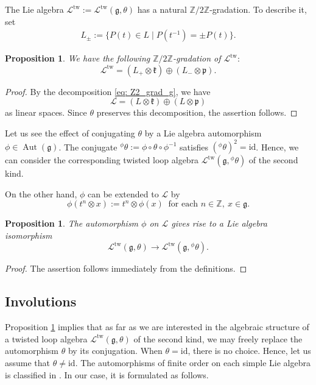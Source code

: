 \documentclass[12pt,a4paper]{amsart}
\newtheorem{prop}[thm]{Proposition}
\theoremstyle{definition}
\numberwithin{equation}{subsection}
\begin{document}
The Lie algebra $\mathcal{L}^\mathrm{tw} := \mathcal{L}^{\mathrm{tw}}(\mathfrak{g},\theta)$ has a natural $\mathbb{Z}/2\mathbb{Z}$-gradation.
To describe it, set
\begin{align}\label{eq: Lpm}
  L_\pm := \{ P(t) \in L \mid P(t^{-1}) = \pm P(t) \}.
\end{align}

\begin{prop}
  We have the following $\mathbb{Z}/2\mathbb{Z}$-gradation of $\mathcal{L}^\mathrm{tw}$$:$
  \[
    \mathcal{L}^\mathrm{tw} = (L_+ \otimes \mathfrak{k}) \oplus (L_- \otimes \mathfrak{p}).
  \]
\end{prop}

\begin{proof}
  By the decomposition \eqref{eq: Z2_grad_g}, we have
  \[
    \mathcal{L} = (L \otimes \mathfrak{k}) \oplus (L \otimes \mathfrak{p})
  \]
  as linear spaces.
  Since $\theta$ preserves this decomposition, the assertion follows.
\end{proof}


Let us see the effect of conjugating $\theta$ by a Lie algebra automorphism $\phi \in \operatorname{Aut}(\mathfrak{g})$.
The conjugate ${}^\phi \theta := \phi \circ \theta \circ \phi^{-1}$ satisfies $({}^\phi \theta)^2 = \mathrm{id}$.
Hence, we can consider the corresponding twisted loop algebra $\mathcal{L}^{\mathrm{tw}}(\mathfrak{g},{}^\phi \theta)$ of the second kind.

On the other hand, $\phi$ can be extended to $\mathcal{L}$ by
\[
  \phi(t^n \otimes x) := t^n \otimes \phi(x) \ \text{ for each } n \in \mathbb{Z},\ x \in \mathfrak{g}.
\]

\begin{prop}\label{prop: conjugation}
  The automorphism $\phi$ on $\mathcal{L}$ gives rise to a Lie algebra isomorphism
  \[
    \mathcal{L}^{\mathrm{tw}}(\mathfrak{g},\theta) \rightarrow \mathcal{L}^{\mathrm{tw}}(\mathfrak{g},{}^\phi \theta).
  \]
\end{prop}

\begin{proof}
  The assertion follows immediately from the definitions.
\end{proof}













\subsection{Involutions}\label{subsect: involution}
Proposition \ref{prop: conjugation} implies that as far as we are interested in the algebraic structure of a twisted loop algebra $\mathcal{L}^{\mathrm{tw}}(\mathfrak{g},\theta)$ of the second kind, we may freely replace the automorphism $\theta$ by its conjugation.
When $\theta = \mathrm{id}$, there is no choice.
Hence, let us assume that $\theta \neq \mathrm{id}$.
The automorphisms of finite order on each simple Lie algebra is classified in \cite[Section 8.6]{Kac83}.
In our case, it is formulated as follows.
\end{document}
